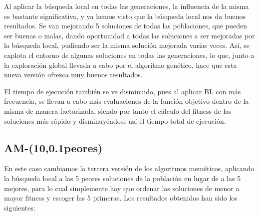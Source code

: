 \documentclass[10pt,a4paper]{article}
\begin{document}
Al aplicar la búsqueda local en todas las generaciones, la influencia de la misma es bastante significativa, y ya hemos visto que la búsqueda local nos da buenos resultados. Se van mejorando 5 soluciones de todas las poblaciones, que pueden ser buenas o malas, dando oportunidad a todas las soluciones a ser mejoradas por la búsqueda local, pudiendo ser la misma solución mejorada varias veces. Así, se explota el entorno de algunas soluciones en todas las generaciones, lo que, junto a la exploración global llevada a cabo por el algoritmo genético, hace que esta nueva versión ofrezca muy buenos resultados. 

El tiempo de ejecución también se ve disminuido, pues al aplicar BL con más frecuencia, se llevan a cabo más evaluaciones de la función objetivo dentro de la misma de manera factorizada, siendo por tanto el cálculo del fitness de las soluciones más rápido y disminuyéndose así el tiempo total de ejecución. 

\subsection{AM-(10,0.1peores)}

En este caso cambiamos la tercera versión de los algoritmos meméticos, aplicando la búsqueda local a las 5 peores soluciones de la población en lugar de a las 5 mejores, para lo cual simplemente hay que ordenar las soluciones de menor a mayor fitness y escoger las 5 primeras. Los resultados obtenidos han sido los siguientes: 
\end{document}
